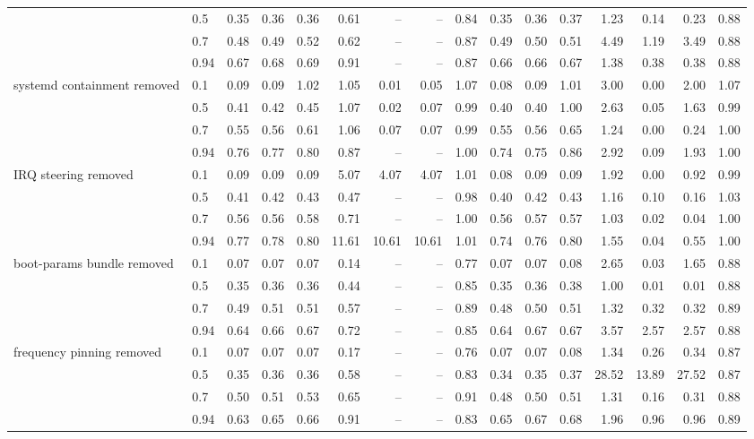 \begin{table}
{\begin{tabular}{llrrrrrrrrrrrrrr}
 & 0.5 & 0.35 & 0.36 & 0.36 & 0.61 & -- & -- & 0.84 & 0.35 & 0.36 & 0.37 & 1.23 & 0.14 & 0.23 & 0.88 \\
 & 0.7 & 0.48 & 0.49 & 0.52 & 0.62 & -- & -- & 0.87 & 0.49 & 0.50 & 0.51 & 4.49 & 1.19 & 3.49 & 0.88 \\
 & 0.94 & 0.67 & 0.68 & 0.69 & 0.91 & -- & -- & 0.87 & 0.66 & 0.66 & 0.67 & 1.38 & 0.38 & 0.38 & 0.88 \\
\cmidrule{1-16}
\multirow[t]{4}{*}{systemd containment removed} & 0.1 & 0.09 & 0.09 & 1.02 & 1.05 & 0.01 & 0.05 & 1.07 & 0.08 & 0.09 & 1.01 & 3.00 & 0.00 & 2.00 & 1.07 \\
 & 0.5 & 0.41 & 0.42 & 0.45 & 1.07 & 0.02 & 0.07 & 0.99 & 0.40 & 0.40 & 1.00 & 2.63 & 0.05 & 1.63 & 0.99 \\
 & 0.7 & 0.55 & 0.56 & 0.61 & 1.06 & 0.07 & 0.07 & 0.99 & 0.55 & 0.56 & 0.65 & 1.24 & 0.00 & 0.24 & 1.00 \\
 & 0.94 & 0.76 & 0.77 & 0.80 & 0.87 & -- & -- & 1.00 & 0.74 & 0.75 & 0.86 & 2.92 & 0.09 & 1.93 & 1.00 \\
\cmidrule{1-16}
\multirow[t]{4}{*}{IRQ steering removed} & 0.1 & 0.09 & 0.09 & 0.09 & 5.07 & 4.07 & 4.07 & 1.01 & 0.08 & 0.09 & 0.09 & 1.92 & 0.00 & 0.92 & 0.99 \\
 & 0.5 & 0.41 & 0.42 & 0.43 & 0.47 & -- & -- & 0.98 & 0.40 & 0.42 & 0.43 & 1.16 & 0.10 & 0.16 & 1.03 \\
 & 0.7 & 0.56 & 0.56 & 0.58 & 0.71 & -- & -- & 1.00 & 0.56 & 0.57 & 0.57 & 1.03 & 0.02 & 0.04 & 1.00 \\
 & 0.94 & 0.77 & 0.78 & 0.80 & 11.61 & 10.61 & 10.61 & 1.01 & 0.74 & 0.76 & 0.80 & 1.55 & 0.04 & 0.55 & 1.00 \\
\cmidrule{1-16}
\multirow[t]{4}{*}{boot-params bundle removed} & 0.1 & 0.07 & 0.07 & 0.07 & 0.14 & -- & -- & 0.77 & 0.07 & 0.07 & 0.08 & 2.65 & 0.03 & 1.65 & 0.88 \\
 & 0.5 & 0.35 & 0.36 & 0.36 & 0.44 & -- & -- & 0.85 & 0.35 & 0.36 & 0.38 & 1.00 & 0.01 & 0.01 & 0.88 \\
 & 0.7 & 0.49 & 0.51 & 0.51 & 0.57 & -- & -- & 0.89 & 0.48 & 0.50 & 0.51 & 1.32 & 0.32 & 0.32 & 0.89 \\
 & 0.94 & 0.64 & 0.66 & 0.67 & 0.72 & -- & -- & 0.85 & 0.64 & 0.67 & 0.67 & 3.57 & 2.57 & 2.57 & 0.88 \\
\cmidrule{1-16}
\multirow[t]{4}{*}{frequency pinning removed} & 0.1 & 0.07 & 0.07 & 0.07 & 0.17 & -- & -- & 0.76 & 0.07 & 0.07 & 0.08 & 1.34 & 0.26 & 0.34 & 0.87 \\
 & 0.5 & 0.35 & 0.36 & 0.36 & 0.58 & -- & -- & 0.83 & 0.34 & 0.35 & 0.37 & 28.52 & 13.89 & 27.52 & 0.87 \\
 & 0.7 & 0.50 & 0.51 & 0.53 & 0.65 & -- & -- & 0.91 & 0.48 & 0.50 & 0.51 & 1.31 & 0.16 & 0.31 & 0.88 \\
 & 0.94 & 0.63 & 0.65 & 0.66 & 0.91 & -- & -- & 0.83 & 0.65 & 0.67 & 0.68 & 1.96 & 0.96 & 0.96 & 0.89 \\
\cmidrule{1-16}
\bottomrule
\end{tabular}%
}
\end{table}
